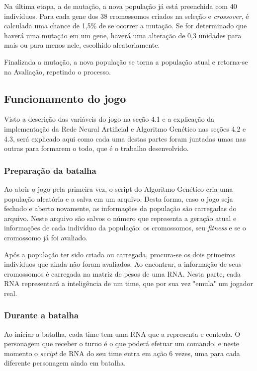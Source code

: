 \documentclass[12pt,a4paper]{article}
\begin{document}
	Na última etapa, a de mutação, a nova população já está preenchida com 40 indivíduos.
	Para cada gene dos 38 cromossomos criados na seleção e \textit{crossover},
	é calculada uma chance de 1,5\% de se ocorrer a mutação.
	Se for determinado que haverá uma mutação em um gene,
	haverá uma alteração de 0,3 unidades para mais ou para menos nele,
	escolhido aleatoriamente.
	
	Finalizada a mutação,
	a nova população se torna a população atual e retorna-se na Avaliação,
	repetindo o processo.
	
	\FloatBarrier
	\subsection{Funcionamento do jogo}
	Visto a descrição das variáveis do jogo na seção 4.1
	e a explicação da implementação da Rede Neural Artificial e Algoritmo Genético nas seções 4.2 e 4.3,
	será explicado aqui como cada uma destas partes foram juntadas umas nas outras para formarem o todo,
	que é o trabalho desenvolvido.
	
	\subsubsection{Preparação da batalha}
	Ao abrir o jogo pela primeira vez,
	o script do Algoritmo Genético cria uma população aleatória e a salva em um arquivo.
	Desta forma, caso o jogo seja fechado e aberto novamente,
	as informações da população são carregadas do arquivo.
	Neste arquivo são salvos o número que representa a geração atual
	e informações de cada indivíduo da população: os cromossomos, seu \textit{fitness} e se o cromossomo já foi avaliado.
	
	Após a população ter sido criada ou carregada,
	procura-se os dois primeiros indivíduos que ainda não foram avaliados.
	Ao encontrar, a informação de seus cromossomos é carregada na matriz de pesos de uma RNA.
	Nesta parte, cada RNA representará a inteligência de um time,
	que por sua vez "emula"{} um jogador real.
	
	\subsubsection{Durante a batalha}
	Ao iniciar a batalha, cada time tem uma RNA que a representa e controla.
	O personagem que receber o turno é o que poderá efetuar um comando,
	e neste momento o \textit{script} de RNA do seu time entra em ação 6 vezes,
	uma para cada diferente personagem ainda em batalha.
	
\end{document}
